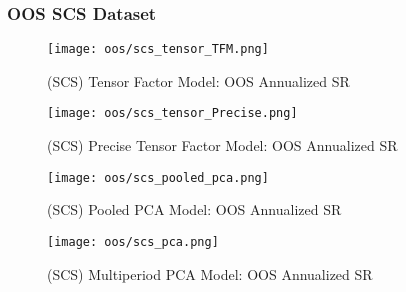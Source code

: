 \subsubsection{OOS SCS Dataset}

\begin{figure}[H]
    \centering
    \texttt{[image: oos/scs\_tensor\_TFM.png]}
    \caption{(SCS) Tensor Factor Model: OOS Annualized SR}
    \label{fig:scs-oos-tfm}
\end{figure}

\begin{figure}[H]
    \centering
    \texttt{[image: oos/scs\_tensor\_Precise.png]}
    \caption{(SCS) Precise Tensor Factor Model: OOS Annualized SR}
    \label{fig:scs-oos-precise}
\end{figure}

\begin{figure}[H]
    \centering
    \texttt{[image: oos/scs\_pooled\_pca.png]}
    \caption{(SCS) Pooled PCA Model: OOS Annualized SR}
    \label{fig:scs-oos-pooled-pca}
\end{figure}

\begin{figure}[H]
    \centering
    \texttt{[image: oos/scs\_pca.png]}
    \caption{(SCS) Multiperiod PCA Model: OOS Annualized SR}
    \label{fig:scs-oos-pca}
\end{figure}
